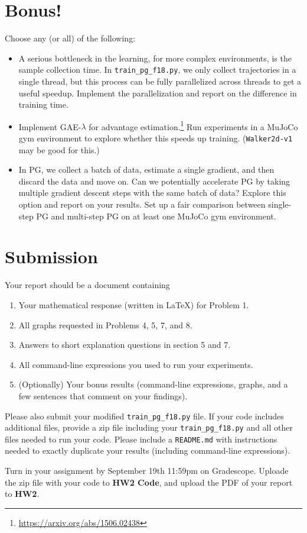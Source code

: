 \documentclass[12pt]{article}
\begin{document}
\section{Bonus!}

Choose any (or all) of the following:
\begin{itemize}
\item A serious bottleneck in the learning, for more complex environments, is the sample collection time. In \verb|train_pg_f18.py|, we only collect trajectories in a single thread, but this process can be fully parallelized across threads to get a useful speedup. Implement the parallelization and report on the difference in training time. 
\item Implement GAE-$\lambda$ for advantage estimation.\footnote{\url{https://arxiv.org/abs/1506.02438}} Run experiments in a MuJoCo gym environment to explore whether this speeds up training. (\verb|Walker2d-v1| may be good for this.)
\item In PG, we collect a batch of data, estimate a single gradient, and then discard the data and move on. Can we potentially accelerate PG by taking multiple gradient descent steps with the same batch of data? Explore this option and report on your results. Set up a fair comparison between single-step PG and multi-step PG on at least one MuJoCo gym environment. 
\end{itemize}

\section{Submission}
Your report should be a document containing 
\begin{enumerate} [label=(\alph*)]
\item 
Your mathematical response (written in \LaTeX) for Problem 1.
\item All graphs requested in Problems 4, 5, 7, and 8.
\item Answers to short explanation questions in section 5 and 7.
\item All command-line expressions you used to run your experiments.
\item (Optionally) Your bonus results (command-line expressions, graphs, and a few sentences that comment on your findings).
\end{enumerate}

Please also submit your modified \verb|train_pg_f18.py| file. If your code includes additional files, provide a zip file including your \verb|train_pg_f18.py| and all other files needed to run your code. Please include a \verb|README.md| with instructions needed to exactly duplicate your results (including command-line expressions).

Turn in your assignment by September 19th 11:59pm on Gradescope. Uploade the zip file with your code to \textbf{HW2 Code}, and upload  the PDF of your report to \textbf{HW2}.
\end{document}
